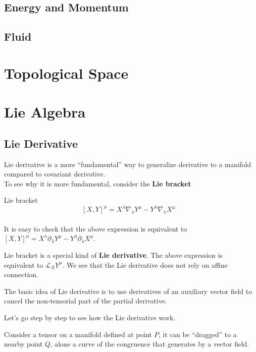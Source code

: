 \documentclass[12pt]{article}
\theoremstyle{mystyle}{\newtheorem{definition}{Definition}[section]}
\theoremstyle{mystyle}{\newtheorem{theorem}[definition]{Theorem}}
\theoremstyle{mystyle}{\newtheorem*{remark}{Remark}}
\theoremstyle{mystyle}{\newtheorem*{example}{Example}}
\theoremstyle{mystyle}{\newtheorem*{examples}{Examples}}
\theoremstyle{cstyle}{\newtheorem*{cthm}{}}
\begin{document}
\subsection{Energy and Momentum}
\subsection{Fluid}


\section{Topological Space}

\section{Lie Algebra}

\subsection{Lie Derivative}
Lie derivative is a more ``fundamental'' way to generalize derivative to a manifold compared to covariant derivative. \\
To see why it is more fundamental, consider the \textbf{Lie bracket} 
\begin{definition}
  Lie bracket \\
  \[\left[X, Y\right]^{\mu}= X^{\lambda}\nabla_{\lambda}Y^{\mu} - Y^{\lambda}\nabla_\lambda X^{\mu}\]\\
  It is easy to check that the above expression is equivalent to 
  \(\left[X, Y\right]^{\mu}= X^{\lambda}\partial_{\lambda}Y^{\mu} - Y^{\lambda}\partial_\lambda X^{\mu}\).
\end{definition}

Lie bracket is a special kind of \textbf{Lie derivative}. The above expression is equivalent to 
\(\mathcal{L}_{X}Y^{\mu}\). We see that the Lie derivative does not rely on affine connection.

The basic idea of Lie derivative is to use derivatives of an auxiliary vector field to 
cancel the non-tensorial part of the partial derivative.

Let's go step by step to see how the Lie derivative work.

Consider a tensor on a manifold defined at point \(P\), it can be ``dragged'' to a nearby point \(Q\), alone 
a curve of the congruence that generates by a vector field. 
\end{document}
